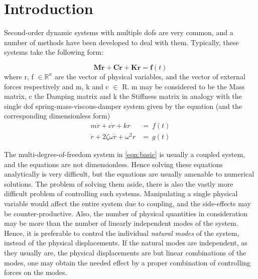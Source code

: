 \chapter{Introduction}
\label{chap:intro}
Second-order dynamic systems with multiple \glspl{dof} are very common,
and a number of methods have been developed to deal with them. Typically, 
these systems take the following form:

\begin{equation}
	\mathbf{M\ddot{r} + C\dot{r} + Kr = f}(t) \label{eqn:basic}
\end{equation}
where \gls{r}, \gls{f} $\in \mathbb{R}^n$ are the vector of physical variables,
and the vector of external forces respectively and  \gls{m}, \gls{k} and \gls{c}
$\in$ \gls{R}. \gls{m} may be considered to be the Mass matrix, \gls{c} the 
Damping matrix and \gls{k} the Stiffness matrix in analogy with the single 
\gls{dof} spring-mass-viscous-damper system given by the equation 
(and the corresponding dimensionless form)
\begin{subequations}
\begin{align}	
	m\ddot{r} + c\dot{r} + kr &=~f(t) \label{eqn:simple}\\
	\ddot{r} + 2\zeta\omega\dot{r} + \omega^2r &=~g(t) \label{eqn:simple_nodim}
\end{align}
\end{subequations}

The multi-degree-of-freedom system in \autoref{eqn:basic} is usually a coupled system, 
and the equations are not dimensionless. Hence solving these equations
analytically is very difficult, but the equations are usually amenable to numerical
solutions. The problem of solving them aside, there is also the vastly more 
difficult problem of controlling such systems. Manipulating a single physical 
variable would affect the entire system due to coupling, and the side-effects may
be counter-productive. Also, the number of physical quantities in consideration 
may be more than the number of linearly independent modes of the system. 
Hence, it is preferable to control the individual \emph{natural modes} of the system, 
instead of the physical displacements. If the natural modes are independent, as
they usually are, the physical displacements are but linear combinations of the 
modes, one may obtain the needed effect by a proper combination of controlling 
forces on the modes. 

